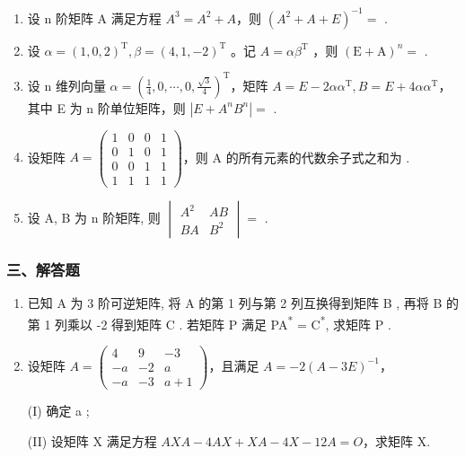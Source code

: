 \documentclass[12pt, a4paper]{ctexart}
\begin{document}
\begin{enumerate}[start=8]
    \item 设 n 阶矩阵 A 满足方程 $ A^{3}=A^{2}+A $，则 $ \left(A^{2}+A+E\right)^{-1}= $ \underline{\hspace{2cm}}.

    \item 设 $ \alpha=(1,0,2)^{\mathrm{T}},\beta=(4,1,-2)^{\mathrm{T}} $ 。记 $ A=\alpha\beta^{\mathrm{T}} $ ，则 $ (\mathrm{E}+\mathrm{A})^{n}= $ \underline{\hspace{2cm}}.

    \item 设 n 维列向量 $ \alpha = \left( \frac{1}{4}, 0, \cdots, 0, \frac{\sqrt{3}}{4} \right)^{\mathrm{T}} $，矩阵 $ A = E - 2\alpha\alpha^{\mathrm{T}}, B = E + 4\alpha\alpha^{\mathrm{T}} $，其中 E 为 n 阶单位矩阵，则 $ \left| E + A^{n}B^{n} \right| = $ \underline{\hspace{2cm}}.

    \item 设矩阵 $ A=\begin{pmatrix}1&0&0&1\\0&1&0&1\\0&0&1&1\\1&1&1&1\end{pmatrix} $，则 A 的所有元素的代数余子式之和为 \underline{\hspace{2cm}}.

    \item 设 A, B 为 n 阶矩阵, 则 $ \begin{vmatrix} A^{2} & AB \\ BA & B^{2} \end{vmatrix} = $ \underline{\hspace{2cm}}.
\end{enumerate}

\subsubsection*{三、解答题}

\begin{enumerate}[start=13]
    \item 已知 A 为 3 阶可逆矩阵, 将 A 的第 1 列与第 2 列互换得到矩阵 B , 再将 B 的第 1 列乘以 -2 得到矩阵 C . 若矩阵 P 满足 PA\textsuperscript{*} = C\textsuperscript{*}, 求矩阵 P .

    \item 设矩阵 $ A=\begin{pmatrix}4&9&-3\\-a&-2&a\\-a&-3&a+1\end{pmatrix} $，且满足 $ A=-2(A-3E)^{-1} $，
    
    (I) 确定 a ;
    
    (II) 设矩阵 X 满足方程 $ A X A - 4 A X + X A - 4 X - 12 A = O $，求矩阵 X.
\end{enumerate}
\end{document}
